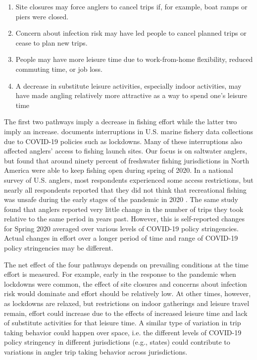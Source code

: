 \documentclass[12pt]{article}
\begin{document}
\begin{enumerate}
\def\labelenumi{\arabic{enumi}.}
\item
  Site closures may force anglers to cancel trips if, for example, boat
  ramps or piers were closed.
\item
  Concern about infection risk may have led people to cancel planned
  trips or cease to plan new trips.
\item
  People may have more leisure time due to work-from-home flexibility,
  reduced commuting time, or job loss.
\item
  A decrease in substitute leisure activities, especially indoor
  activities, may have made angling relatively more attractive as a way
  to spend one's leisure time \citep{midway2021covid,morales2021contrasting}
\end{enumerate}

The first two pathways imply a decrease in fishing effort while the latter two imply an increase. \citet{link2021noaa} documents interruptions in U.S. marine fishery data collections due to COVID-19 policies such as lockdowns. Many of these interruptions also affected anglers' access to fishing launch sites. Our focus is on saltwater anglers, but \citet{paradis2021can} found that around ninety percent of freshwater fishing jurisdictions in North America were able to keep fishing open during spring of 2020. In a national survey of U.S. anglers, most respondents experienced some access restrictions, but nearly all respondents reported that they did not think that recreational fishing was unsafe during the early stages of the pandemic in 2020 \citep{midway2021covid}. The same study found that anglers reported very little change in the number of trips they took relative to the same period in years past. However, this is self-reported changes for Spring 2020 averaged over various levels of COVID-19 policy stringencies.  Actual changes in effort over a longer period of time and range of COVID-19 policy stringencies may be different. 

The net effect of the four pathways depends on prevailing conditions at the time effort is measured. For example, early in the response to the pandemic when lockdowns were common, the effect of site closures and concerns about infection risk would dominate and effort should be relatively low. At other times, however, as lockdowns are relaxed, but restrictions on indoor gatherings and leisure travel remain, effort could increase due to the effects of increased leisure time and lack of substitute activities for that leisure time. A similar type of variation in trip taking behavior could happen over space, i.e. the different levels of COVID-19 policy stringency in different jurisdictions (e.g., states) could contribute to variations in angler trip taking behavior across jurisdictions.
\end{document}
